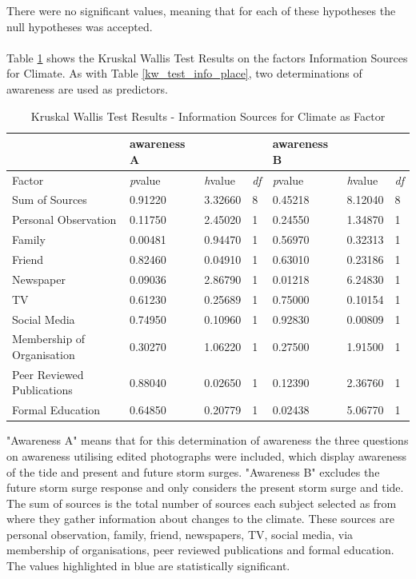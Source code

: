 There were no significant values, meaning that for each of these hypotheses the null hypotheses was accepted.
\paragraph{}
Table \ref{kwtest_info_climate} shows the Kruskal Wallis Test Results on the factors Information Sources for Climate. As with Table \ref{kw_test_info_place}, two determinations of awareness are used as predictors.



\begin{table}[H]
    \centering
    \begin{tabular}{|l|l|l|l|l|l|l|}
    \hline
        & \textbf{awareness A} & ~ & ~ & \textbf{awareness B} & ~ & ~ \\ \hline
        Factor &\textit{p}value &\textit{h}value & \textit{df} & \textit{p}value &\textit{h}value & \textit{df} \\ \hline
        Sum of Sources & 0.91220 & 3.32660 & 8 & 0.45218 & 8.12040 & 8 \\ \hline
        Personal Observation & 0.11750 & 2.45020 & 1 & 0.24550 & 1.34870 & 1 \\ \hline
        Family & \cellcolor[HTML]{7df9ff} 0.00481 & 0.94470 & 1 & 0.56970 & 0.32313 & 1 \\ \hline
        Friend & 0.82460 & 0.04910 & 1 & 0.63010 & 0.23186 & 1 \\ \hline
        Newspaper & 0.09036 & 2.86790 & 1 & \cellcolor[HTML]{7df9ff} 0.01218 & 6.24830 & 1 \\ \hline
        TV & 0.61230 & 0.25689 & 1 & 0.75000 & 0.10154 & 1 \\ \hline
        Social Media & 0.74950 & 0.10960 & 1 & 0.92830 & 0.00809 & 1 \\ \hline
        Membership of Organisation & 0.30270 & 1.06220 & 1 & 0.27500 & 1.91500 & 1 \\ \hline
        Peer Reviewed Publications  & 0.88040 & 0.02650 & 1 & 0.12390 & 2.36760 & 1 \\ \hline
        Formal Education & 0.64850 & 0.20779 & 1 & \cellcolor[HTML]{7df9ff} 0.02438 & 5.06770 & 1 \\ \hline
    \end{tabular}
    \caption{Kruskal Wallis Test Results - Information Sources for Climate as Factor}{ "Awareness A" means that for this determination of awareness the three questions on awareness utilising edited photographs were included, which display awareness of the tide and present and future storm surges.  "Awareness B" excludes the future storm surge response and only considers the present storm surge and tide.  The sum of sources is the total number of sources each subject selected as from where they gather information about changes to the climate. These sources are personal observation, family, friend, newspapers, TV, social media, via membership of organisations, peer reviewed publications and formal education. The values highlighted in blue are statistically significant. }
    \label{kwtest_info_climate}
\end{table}

